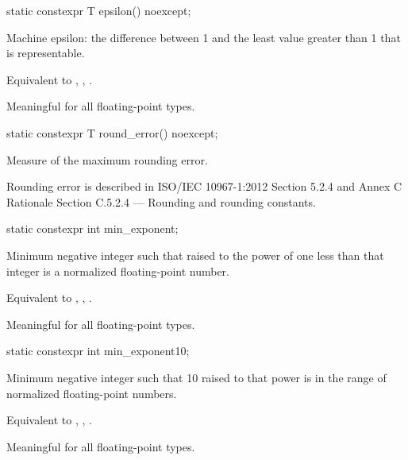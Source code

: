 %
\begin{itemdecl}
static constexpr T epsilon() noexcept;
\end{itemdecl}

\begin{itemdescr}
\pnum
Machine epsilon:  the difference between 1 and the least value greater than 1
that is representable.
\begin{footnote}
Equivalent to , , .
\end{footnote}

\pnum
Meaningful for all floating-point types.
\end{itemdescr}

%
\begin{itemdecl}
static constexpr T round_error() noexcept;
\end{itemdecl}

\begin{itemdescr}
\pnum
Measure of the maximum rounding error.
\begin{footnote}
Rounding error is described in ISO/IEC 10967-1:2012 Section 5.2.4 and
Annex C Rationale Section C.5.2.4 --- Rounding and rounding constants.
\end{footnote}
\end{itemdescr}

%
\begin{itemdecl}
static constexpr int min_exponent;
\end{itemdecl}

\begin{itemdescr}
\pnum
Minimum negative integer such that
raised to the power of one less than that integer is a normalized floating-point
number.
\begin{footnote}
Equivalent to , ,
.
\end{footnote}

\pnum
Meaningful for all floating-point types.
\end{itemdescr}

%
\begin{itemdecl}
static constexpr int min_exponent10;
\end{itemdecl}

\begin{itemdescr}
\pnum
Minimum negative integer such that 10 raised to that power is in the range
of normalized floating-point numbers.
\begin{footnote}
Equivalent to
, , .
\end{footnote}

\pnum
Meaningful for all floating-point types.
\end{itemdescr}

